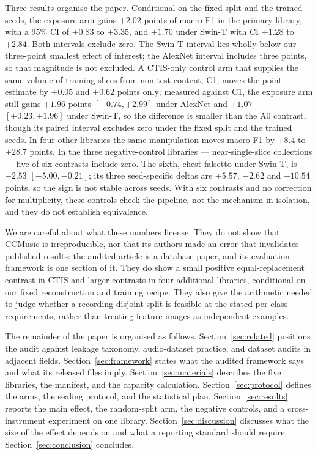 Three results organise the paper. Conditional on the fixed split and the trained seeds, the
exposure arm gains $+2.02$ points of macro-F1 in the primary library, with a 95\% CI of $+0.83$ to $+3.35$, and $+1.70$ under
Swin-T with CI $+1.28$ to $+2.84$. Both intervals exclude zero. The Swin-T interval
lies wholly below our three-point smallest effect of interest;
the AlexNet interval includes three points, so that magnitude is not excluded. A CTIS-only
control arm that supplies the same volume of training slices from non-test content, C1, moves
the point estimate by $+0.05$ and $+0.62$ points only; measured against C1, the exposure arm
still gains $+1.96$ points $[+0.74,+2.99]$ under AlexNet and $+1.07$ $[+0.23,+1.96]$ under
Swin-T, so the difference is smaller than the A0 contrast, though its paired interval excludes zero under
the fixed split and the trained seeds. In four other libraries
the same manipulation moves macro-F1 by $+8.4$ to $+28.7$ points. In the three negative-control
libraries --- near-single-slice collections --- five of six contrasts include zero. The sixth,
chest falsetto under Swin-T, is $-2.53$ $[-5.00,-0.21]$; its three seed-specific deltas are
$+5.57$, $-2.62$ and $-10.54$ points, so the sign is not stable across seeds. With six
contrasts and no correction for multiplicity, these controls check the pipeline, not the
mechanism in isolation, and they do not establish equivalence.

We are careful about what these numbers license. They do not show that CCMusic is
irreproducible, nor that its authors made an error that invalidates published results: the
audited article is a database paper, and its evaluation framework is one section of it. They do
show a small positive equal-replacement contrast in CTIS and larger contrasts in four additional
libraries, conditional on our fixed reconstruction and training recipe. They also give the
arithmetic needed to judge whether a recording-disjoint split is feasible at the stated
per-class requirements, rather than treating feature images as independent examples.

The remainder of the paper is organised as follows. Section~\ref{sec:related} positions the
audit against leakage taxonomy, audio-dataset practice, and dataset audits in adjacent fields.
Section~\ref{sec:framework} states what the audited framework says and what its released files
imply. Section~\ref{sec:materials} describes the five libraries, the manifest, and the
capacity calculation. Section~\ref{sec:protocol} defines the arms, the sealing protocol, and
the statistical plan. Section~\ref{sec:results} reports the main effect, the random-split arm,
the negative controls, and a cross-instrument experiment on one library.
Section~\ref{sec:discussion} discusses what the size of the effect depends on and what a
reporting standard should require. Section~\ref{sec:conclusion} concludes.
